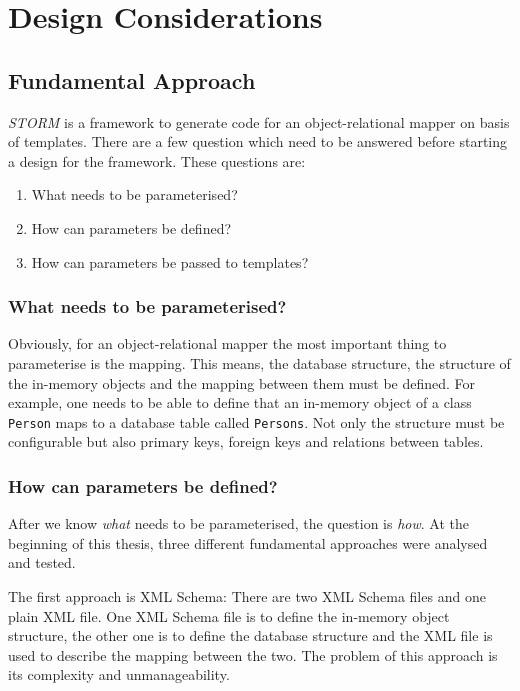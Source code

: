 \chapter{Design Considerations}
\label{cha:designConsiderations}
	
	\section{Fundamental Approach}
		\textit{STORM} is a framework to generate code for an object-relational mapper on
		basis of templates. There are a few question which need to be answered before starting
		a design for the framework. These questions are:
		
		\begin{enumerate}
			\item	What needs to be parameterised?
			\item How can parameters be defined?
			\item How can parameters be passed to templates?
		\end{enumerate}
		
		\subsection{What needs to be parameterised?}
			Obviously, for an object-relational mapper the most important thing to parameterise
			is the mapping. This means, the database structure, the structure of the in-memory objects
			and the mapping between them must be defined. For example, one needs to be able to define
			that an in-memory object of a class \verb~Person~ maps to a database table called \verb~Persons~.
			Not only the structure must be configurable but also primary keys,
			foreign keys and relations between tables.
		
		\subsection{How can parameters be defined?}
			After we know \emph{what} needs to be parameterised, the question is \emph{how}. At the beginning
			of this thesis, three different fundamental approaches were analysed and tested.
			
			The first approach is XML Schema: There are two XML Schema files and one plain XML file.
			One XML Schema file is to define the in-memory object structure, the other one is to define
			the database structure and the XML file is used to describe the mapping between the two.
			The problem of this approach is its complexity and unmanageability.
			
